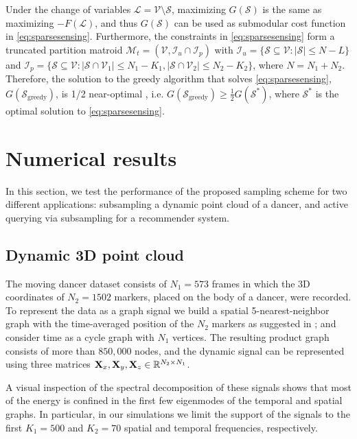 \documentclass{article}
\begin{document}
Under the change of variables $\mathcal{L}=\mathcal{V}\setminus\mathcal{S}$, maximizing $G(\mathcal{S})$ is the same as maximizing $-F(\mathcal{L})$, and thus $G(\mathcal{S})$ can be used as submodular cost function in \eqref{eq:sparsesensing}. Furthermore, the constraints in \eqref{eq:sparsesensing} form a truncated partition matroid \cite{discrete_optimization} $\mathcal{M}_t=(\mathcal{V},\mathcal{I}_u\cap\mathcal{I}_p)$ with $\mathcal{I}_u=\{\mathcal{S}\subseteq\mathcal{V}:|\mathcal{S}|\leq N-L\}$ and $\mathcal{I}_p=\{\mathcal{S}\subseteq\mathcal{V}:|\mathcal{S}\cap\mathcal{V}_1|\leq N_1-K_1, |\mathcal{S}\cap\mathcal{V}_2|\leq N_2-K_2\}$, where $N=N_1+N_2$. Therefore, the solution to the greedy algorithm that solves \eqref{eq:sparsesensing}, $G(\mathcal{S}_\text{greedy})$, is 1/2 near-optimal \cite{submodular_2}, i.e. $G(\mathcal{S}_\text{greedy})\geq \frac{1}{2}G(\mathcal{S}^*)$, where $\mathcal{S}^*$ is the optimal solution to \eqref{eq:sparsesensing}.

\section{Numerical results}

In this section, we test the performance of the proposed sampling scheme for two different applications: subsampling a dynamic point cloud of a  dancer, and active querying via subsampling for a recommender system.

\subsection{Dynamic 3D point cloud}

The moving dancer dataset consists of $N_1=573$ frames in which the 3D coordinates of $N_2=1502$ markers, placed on the body of a dancer, were recorded. To represent the data as a graph signal we build a spatial 5-nearest-neighbor graph with the time-averaged position of the $N_2$ markers as suggested in \cite{jtv}; and consider time as a cycle graph with $N_1$ vertices. The resulting product graph consists of more than $850,000$ nodes, and the dynamic signal can be represented using three matrices $\boldsymbol{\mathrm{X}}_x, \boldsymbol{\mathrm{X}}_y,\boldsymbol{\mathrm{X}}_z\in\mathbb{R}^{N_2\times N_1}$.

A visual inspection of the spectral decomposition of these signals  shows that most of the energy is confined in the first few eigenmodes of the temporal and spatial graphs. In particular, in our simulations we limit the support of the signals to the first $K_1=500$ and $K_2=70$ spatial and temporal frequencies, respectively.
\end{document}
